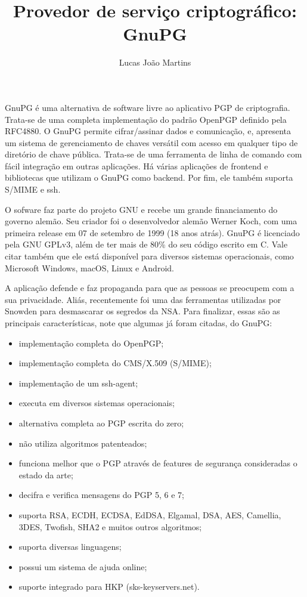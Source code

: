 \documentclass[12pt]{article}
\title{Provedor de serviço criptográfico: \\ GnuPG}
\author{Lucas João Martins}
\date{}
\begin{document}
\maketitle

\doublespacing
\section*{}
GnuPG é uma alternativa de software livre ao aplicativo PGP de criptografia. Trata-se de uma completa implementação do padrão OpenPGP definido pela RFC4880. O GnuPG permite cifrar/assinar dados e comunicação, e, apresenta um sistema de gerenciamento de chaves versátil com acesso em qualquer tipo de diretório de chave pública. Trata-se de uma ferramenta de linha de comando com fácil integração em outras aplicações. Há várias aplicações de frontend e bibliotecas que utilizam o GnuPG como backend. Por fim, ele também suporta S/MIME e ssh.

O sofware faz parte do projeto GNU e recebe um grande financiamento do governo alemão. Seu criador foi o desenvolvedor alemão Werner Koch, com uma primeira release em 07 de setembro de 1999 (18 anos atrás). GnuPG é licenciado pela GNU GPLv3, além de ter mais de 80\% do seu código escrito em C. Vale citar também que ele está disponível para diversos sistemas operacionais, como Microsoft Windows, macOS, Linux e Android.

A aplicação defende e faz propaganda para que as pessoas se preocupem com a sua privacidade. Aliás, recentemente foi uma das ferramentas utilizadas por Snowden para desmascarar os segredos da NSA. Para finalizar, essas são as principais características, note que algumas já foram citadas, do GnuPG:
\begin{itemize}
\item implementação completa do OpenPGP;
\item implementação completa do CMS/X.509 (S/MIME);
\item implementação de um ssh-agent;
\item executa em diversos sistemas operacionais;
\item alternativa completa ao PGP escrita do zero;
\item não utiliza algoritmos patenteados;
\item funciona melhor que o PGP através de features de segurança consideradas o estado da arte;
\item decifra e verifica mensagens do PGP 5, 6 e 7;
\item suporta RSA, ECDH, ECDSA, EdDSA, Elgamal, DSA, AES, Camellia, 3DES, Twofish, SHA2 e muitos outros algoritmos;
\item suporta diversas linguagens;
\item possui um sistema de ajuda online;
\item suporte integrado para HKP (sks-keyservers.net).
\end{itemize}
\end{document}
